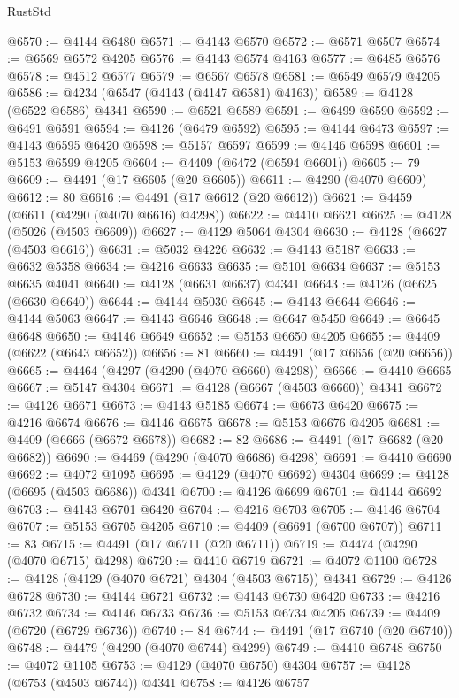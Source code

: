 \begin{lexlean}{RustStd}
\begin{coremodule}
@6570 := @4144 @6480
@6571 := @4143 @6570
@6572 := @6571 @6507
@6574 := @6569 @6572 @4205
@6576 := @4143 @6574 @4163
@6577 := @6485 @6576
@6578 := @4512 @6577
@6579 := @6567 @6578
@6581 := @6549 @6579 @4205
@6586 := @4234 (@6547 (@4143 (@4147 @6581) @4163))
@6589 := @4128 (@6522 @6586) @4341
@6590 := @6521 @6589
@6591 := @6499 @6590
@6592 := @6491 @6591
@6594 := @4126 (@6479 @6592)
@6595 := @4144 @6473
@6597 := @4143 @6595 @6420
@6598 := @5157 @6597
@6599 := @4146 @6598
@6601 := @5153 @6599 @4205
@6604 := @4409 (@6472 (@6594 @6601))
@6605 := 79
@6609 := @4491 (@17 @6605 (@20 @6605))
@6611 := @4290 (@4070 @6609)
@6612 := 80
@6616 := @4491 (@17 @6612 (@20 @6612))
@6621 := @4459 (@6611 (@4290 (@4070 @6616) @4298))
@6622 := @4410 @6621
@6625 := @4128 (@5026 (@4503 @6609))
@6627 := @4129 @5064 @4304
@6630 := @4128 (@6627 (@4503 @6616))
@6631 := @5032 @4226
@6632 := @4143 @5187
@6633 := @6632 @5358
@6634 := @4216 @6633
@6635 := @5101 @6634
@6637 := @5153 @6635 @4041
@6640 := @4128 (@6631 @6637) @4341
@6643 := @4126 (@6625 (@6630 @6640))
@6644 := @4144 @5030
@6645 := @4143 @6644
@6646 := @4144 @5063
@6647 := @4143 @6646
@6648 := @6647 @5450
@6649 := @6645 @6648
@6650 := @4146 @6649
@6652 := @5153 @6650 @4205
@6655 := @4409 (@6622 (@6643 @6652))
@6656 := 81
@6660 := @4491 (@17 @6656 (@20 @6656))
@6665 := @4464 (@4297 (@4290 (@4070 @6660) @4298))
@6666 := @4410 @6665
@6667 := @5147 @4304
@6671 := @4128 (@6667 (@4503 @6660)) @4341
@6672 := @4126 @6671
@6673 := @4143 @5185
@6674 := @6673 @6420
@6675 := @4216 @6674
@6676 := @4146 @6675
@6678 := @5153 @6676 @4205
@6681 := @4409 (@6666 (@6672 @6678))
@6682 := 82
@6686 := @4491 (@17 @6682 (@20 @6682))
@6690 := @4469 (@4290 (@4070 @6686) @4298)
@6691 := @4410 @6690
@6692 := @4072 @1095
@6695 := @4129 (@4070 @6692) @4304
@6699 := @4128 (@6695 (@4503 @6686)) @4341
@6700 := @4126 @6699
@6701 := @4144 @6692
@6703 := @4143 @6701 @6420
@6704 := @4216 @6703
@6705 := @4146 @6704
@6707 := @5153 @6705 @4205
@6710 := @4409 (@6691 (@6700 @6707))
@6711 := 83
@6715 := @4491 (@17 @6711 (@20 @6711))
@6719 := @4474 (@4290 (@4070 @6715) @4298)
@6720 := @4410 @6719
@6721 := @4072 @1100
@6728 := @4128 (@4129 (@4070 @6721) @4304 (@4503 @6715)) @4341
@6729 := @4126 @6728
@6730 := @4144 @6721
@6732 := @4143 @6730 @6420
@6733 := @4216 @6732
@6734 := @4146 @6733
@6736 := @5153 @6734 @4205
@6739 := @4409 (@6720 (@6729 @6736))
@6740 := 84
@6744 := @4491 (@17 @6740 (@20 @6740))
@6748 := @4479 (@4290 (@4070 @6744) @4299)
@6749 := @4410 @6748
@6750 := @4072 @1105
@6753 := @4129 (@4070 @6750) @4304
@6757 := @4128 (@6753 (@4503 @6744)) @4341
@6758 := @4126 @6757

\end{coremodule}
\end{lexlean}
